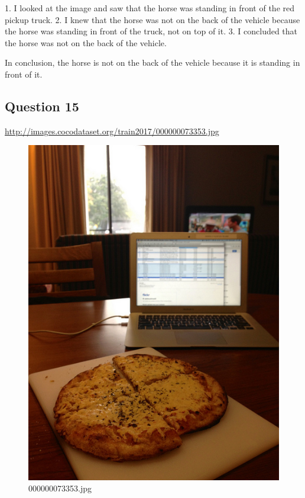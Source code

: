 \begin{enumerate}
        1. I looked at the image and saw that the horse was standing in front of the red pickup truck.
        2. I knew that the horse was not on the back of the vehicle because the horse was standing in front of the truck, not on top of it.
        3. I concluded that the horse was not on the back of the vehicle.
        
        In conclusion, the horse is not on the back of the vehicle because it is standing in front of it.
    \end{enumerate}
\subsection*{Question 15}
\url{http://images.cocodataset.org/train2017/000000073353.jpg}
    \begin{figure}[h]
        \centering
        \includegraphics[width=0.8\linewidth]{../image set/easy/000000073353.jpg}
        \caption{000000073353.jpg}
    \end{figure}
